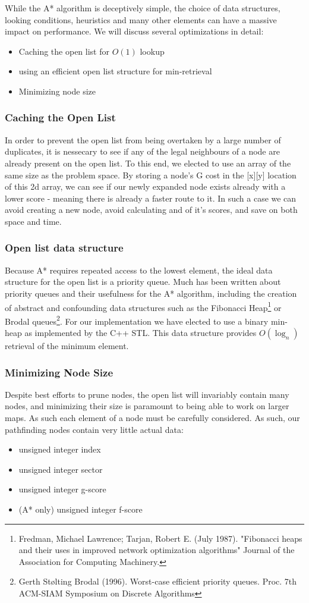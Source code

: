 \documentclass{article}
\begin{document}
While the A* algorithm is deceptively simple, the choice of data structures, looking conditions, heuristics and many other elements can have a massive impact on performance. We will discuss several optimizations in detail:
\begin{itemize}
    \item Caching the open list for $O(1)$ lookup
    \item using an efficient open list structure for min-retrieval
    \item Minimizing node size
\end{itemize}
\subsubsection*{Caching the Open List}
In order to prevent the open list from being overtaken by a large number of duplicates, it is nessecary to see if any of the legal neighbours of a node are already present on the open list. To this end, we elected to use an array of the same size as the problem space. By storing a node's G cost in the [x][y] location of this 2d array, we can see if our newly expanded node exists already with a lower score - meaning there is already a faster route to it. In such a case we can avoid creating a new node, avoid calculating and of it's scores, and save on both space and time.
\subsubsection*{Open list data structure}
Because A* requires repeated access to the lowest element, the ideal data structure for the open list is a priority queue. Much has been written about priority queues and their usefulness for the A* algorithm, including the creation of abstract and confounding data structures such as the Fibonacci Heap\footnote{Fredman, Michael Lawrence; Tarjan, Robert E. (July 1987). "Fibonacci heaps and their uses in improved network optimization algorithms" Journal of the Association for Computing Machinery.} or Brodal queues\footnote{Gerth Stølting Brodal (1996). Worst-case efficient priority queues. Proc. 7th ACM-SIAM Symposium on Discrete Algorithms}. For our implementation we have elected to use a binary min-heap as implemented by the C++ STL. This data structure provides $O(\log_n)$ retrieval of the minimum element.
\subsubsection*{Minimizing Node Size}
Despite best efforts to prune nodes, the open list will invariably contain many nodes, and minimizing their size is paramount to being able to work on larger maps. As such each element of a node must be carefully considered. As such, our pathfinding nodes contain very little actual data:
\begin{itemize}
    \item unsigned integer index
    \item unsigned integer sector
    \item unsigned integer g-score
    \item (A* only) unsigned integer f-score
\end{itemize}
\end{document}

